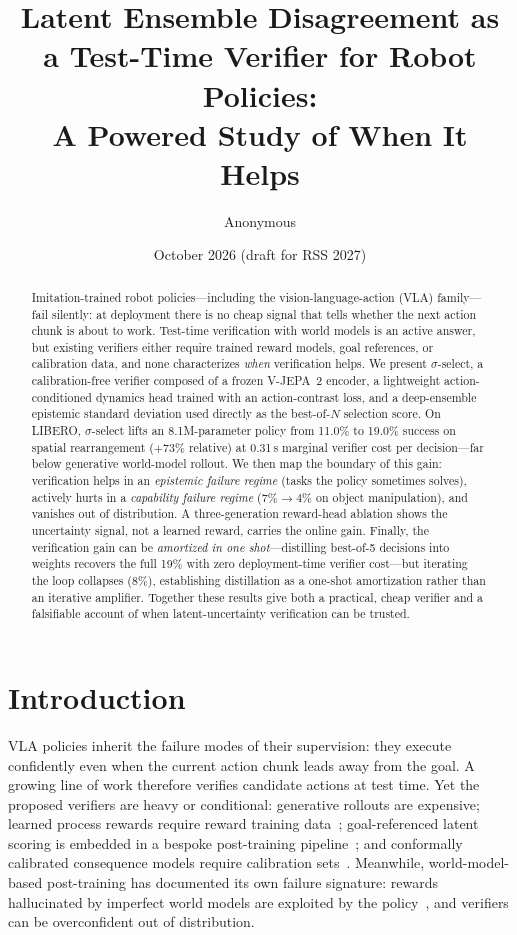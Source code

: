 \documentclass[11pt]{article}
\title{\textbf{Latent Ensemble Disagreement as a Test-Time Verifier for Robot Policies:\\ A Powered Study of When It Helps}}
\author{Anonymous}
\date{October 2026 (draft for RSS 2027)}
\begin{document}
\maketitle

\begin{abstract}
Imitation-trained robot policies---including the vision-language-action (VLA) family---fail silently: at deployment there is no cheap signal that tells whether the next action chunk is about to work. Test-time verification with world models is an active answer, but existing verifiers either require trained reward models, goal references, or calibration data, and none characterizes \emph{when} verification helps. We present $\sigma$-select, a calibration-free verifier composed of a frozen V-JEPA~2 encoder, a lightweight action-conditioned dynamics head trained with an action-contrast loss, and a deep-ensemble epistemic standard deviation used directly as the best-of-$N$ selection score. On LIBERO, $\sigma$-select lifts an 8.1M-parameter policy from 11.0\% to 19.0\% success on spatial rearrangement ($+73\%$ relative) at 0.31\,s marginal verifier cost per decision---far below generative world-model rollout. We then map the boundary of this gain: verification helps in an \emph{epistemic failure regime} (tasks the policy sometimes solves), actively hurts in a \emph{capability failure regime} ($7\%\!\to\!4\%$ on object manipulation), and vanishes out of distribution. A three-generation reward-head ablation shows the uncertainty signal, not a learned reward, carries the online gain. Finally, the verification gain can be \emph{amortized in one shot}---distilling best-of-5 decisions into weights recovers the full 19\% with zero deployment-time verifier cost---but iterating the loop collapses ($8\%$), establishing distillation as a one-shot amortization rather than an iterative amplifier. Together these results give both a practical, cheap verifier and a falsifiable account of when latent-uncertainty verification can be trusted.
\end{abstract}

\section{Introduction}
VLA policies inherit the failure modes of their supervision: they execute confidently even when the current action chunk leads away from the goal. A growing line of work therefore verifies candidate actions at test time. Yet the proposed verifiers are heavy or conditional: generative rollouts are expensive; learned process rewards require reward training data~\citep{rover2025}; goal-referenced latent scoring is embedded in a bespoke post-training pipeline~\citep{atomvla2026}; and conformally calibrated consequence models require calibration sets~\citep{checkvla2026}. Meanwhile, world-model-based post-training has documented its own failure signature: rewards hallucinated by imperfect world models are exploited by the policy~\citep{hawmpo2026}, and verifiers can be overconfident out of distribution.
\end{document}
